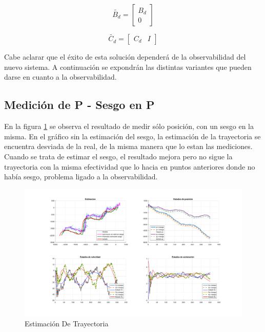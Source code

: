 	\begin{equation*}
			\tilde{B_{d}} = \begin{bmatrix} B_{d} \\[0.3em] 0 \end{bmatrix}
	\end{equation*}
	
	\begin{equation*}
			\tilde{C_{d}} = \begin{bmatrix} C_{d} & I \end{bmatrix}
	\end{equation*}
	
	Cabe aclarar que el éxito de esta solución dependerá de la observabilidad del nuevo sistema. A continuación se expondrán las distintas variantes que pueden darse en cuanto a la observabilidad.


\subsection{Medición de P - Sesgo en P}

	En la figura \ref{fig:ej4a} se observa el resultado de medir sólo posición, con un sesgo en la misma. En el gráfico sin la estimación del sesgo, la estimación de la trayectoria se encuentra desviada de la real, de la misma manera que lo estan las mediciones. Cuando se trata de estimar el sesgo, el resultado mejora pero no sigue la trayectoria con la misma efectividad que lo hacia en puntos anteriores donde no había sesgo, problema ligado a la observabilidad.

	\begin{figure}[H]
		\centering
		\includegraphics[scale=0.5,trim={6,5cm 0 0 0}]{Figuras/graf_ej4a.pdf}
		\caption{Estimación De Trayectoria}
		\label{fig:ej4a}
	\end{figure}
	
